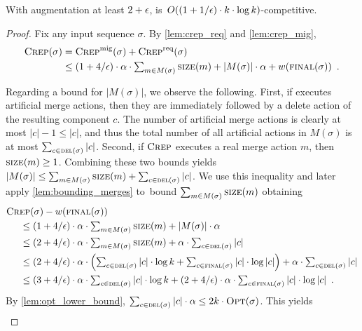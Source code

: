 \begin{theorem}
With augmentation at least $2+\epsilon$, \CREP is~$O((1 + 1/\epsilon) \cdot k \cdot \log k)$-competitive.
\end{theorem}

\begin{proof}
Fix any input sequence $\sigma$. 
By \ref{lem:crep_req} and \ref{lem:crep_mig}, 
\begin{align*}
	\textsc{Crep}(\sigma) 
	= &\; \textsc{Crep}^\textnormal{mig}(\sigma) + \textsc{Crep}^\textnormal{req}(\sigma) \\
	\leq &\; \textstyle (1+4/\epsilon) \cdot \alpha \cdot \sum_{m \in M(\sigma)} \textsc{size}(m) + |M(\sigma)| \cdot \alpha + w(\textsc{final}(\sigma)) 
	\enspace.
\end{align*}

Regarding a bound for $|M(\sigma)|$, we observe the following. First, if \CREP
executes artificial merge actions, then they are immediately followed by a
delete action of the resulting component $c$. The number of artificial merge
actions is clearly at most $|c|-1 \leq |c|$, and thus the total number of all
artificial actions in $M(\sigma)$ is at most $\sum_{c \in \textsc{del}(\sigma)} |c|$.
Second, if $\textsc{Crep}$ executes a real merge action $m$, then
$\textsc{size}(m) \geq 1$. Combining these two bounds yields $|M(\sigma)| \leq \sum_{m
\in M(\sigma)} \textsc{size}(m) + \sum_{c \in \textsc{del}(\sigma)} |c|$. We use this inequality 
and later apply \ref{lem:bounding_merges} to~bound $\sum_{m \in M(\sigma)} 
\textsc{size}(m)$ obtaining
\begin{align*}
	\textsc{Crep}&(\sigma) - w(\textsc{final}(\sigma)) \\
  \leq &\; \textstyle (1+4/\epsilon) \cdot \alpha \cdot \sum_{m \in M(\sigma)} \textsc{size}(m) 
    + |M(\sigma)| \cdot \alpha \\ 
	\leq &\; \textstyle (2+4/\epsilon) \cdot \alpha \cdot \sum_{m \in M(\sigma)} \textsc{size}(m) 
		+ \alpha \cdot \sum_{c \in \textsc{del}(\sigma)} |c|  \\
	\leq &\; \textstyle (2+4/\epsilon) \cdot \alpha \cdot \left( 
			\sum_{c \in \textsc{del}(\sigma)} |c| \cdot \log k + \sum_{c \in \textsc{final}(\sigma)} |c| \cdot \log |c|
			\right)
			+ \alpha \cdot \sum_{c \in \textsc{del}(\sigma)} |c| \\
	\leq &\; \textstyle (3+4/\epsilon) \cdot \alpha \cdot 
			\sum_{c \in \textsc{del}(\sigma)} |c| \cdot \log k 
			+ (2+4/\epsilon) \cdot \alpha \cdot
			\sum_{c \in \textsc{final}(\sigma)} |c| \cdot \log |c|
	\enspace.
\end{align*}
By \ref{lem:opt_lower_bound}, $\sum_{c \in \textsc{del}(\sigma)} |c| \cdot \alpha \leq 
2k \cdot \textsc{Opt}(\sigma)$. This yields
\begin{align*}

\end{align*}
\end{proof}
